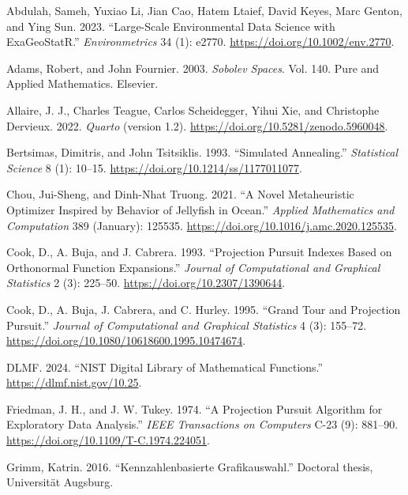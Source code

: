\documentclass[
  12pt,
]{interact}
\newlength{\cslhangindent}
\newenvironment{CSLReferences}[2] %
 {\begin{list}{}{%
  \setlength{\itemindent}{0pt}
  \setlength{\leftmargin}{0pt}
  \setlength{\parsep}{0pt}
  \ifodd #1
   \setlength{\leftmargin}{\cslhangindent}
   \setlength{\itemindent}{-1\cslhangindent}
  \fi
  \setlength{\itemsep}{#2\baselineskip}}}
 {\end{list}}
\theoremstyle{plain}
\begin{document}
\label{refs}
\begin{CSLReferences}{1}{0}
Abdulah, Sameh, Yuxiao Li, Jian Cao, Hatem Ltaief, David Keyes, Marc
Genton, and Ying Sun. 2023. {``Large-Scale Environmental Data Science
with {ExaGeoStatR}.''} \emph{Environmetrics} 34 (1): e2770.
\url{https://doi.org/10.1002/env.2770}.

Adams, Robert, and John Fournier. 2003. \emph{Sobolev Spaces}. Vol. 140.
Pure and Applied Mathematics. Elsevier.

Allaire, J. J., Charles Teague, Carlos Scheidegger, Yihui Xie, and
Christophe Dervieux. 2022. \emph{{Quarto}} (version 1.2).
\url{https://doi.org/10.5281/zenodo.5960048}.

Bertsimas, Dimitris, and John Tsitsiklis. 1993. {``{Simulated
Annealing}.''} \emph{Statistical Science} 8 (1): 10--15.
\url{https://doi.org/10.1214/ss/1177011077}.

Chou, Jui-Sheng, and Dinh-Nhat Truong. 2021. {``A Novel Metaheuristic
Optimizer Inspired by Behavior of Jellyfish in Ocean.''} \emph{Applied
Mathematics and Computation} 389 (January): 125535.
\url{https://doi.org/10.1016/j.amc.2020.125535}.

Cook, D., A. Buja, and J. Cabrera. 1993. {``Projection Pursuit Indexes
Based on Orthonormal Function Expansions.''} \emph{Journal of
Computational and Graphical Statistics} 2 (3): 225--50.
\url{https://doi.org/10.2307/1390644}.

Cook, D., A. Buja, J. Cabrera, and C. Hurley. 1995. {``Grand Tour and
Projection Pursuit.''} \emph{Journal of Computational and Graphical
Statistics} 4 (3): 155--72.
\url{https://doi.org/10.1080/10618600.1995.10474674}.

DLMF. 2024. {``{NIST Digital Library of Mathematical Functions}.''}
\url{https://dlmf.nist.gov/10.25}.

Friedman, J. H., and J. W. Tukey. 1974. {``A Projection Pursuit
Algorithm for Exploratory Data Analysis.''} \emph{IEEE Transactions on
Computers} C-23 (9): 881--90.
\url{https://doi.org/10.1109/T-C.1974.224051}.

Grimm, Katrin. 2016. {``Kennzahlenbasierte Grafikauswahl.''} Doctoral
thesis, Universit{ä}t Augsburg.


\end{CSLReferences}
\end{document}
